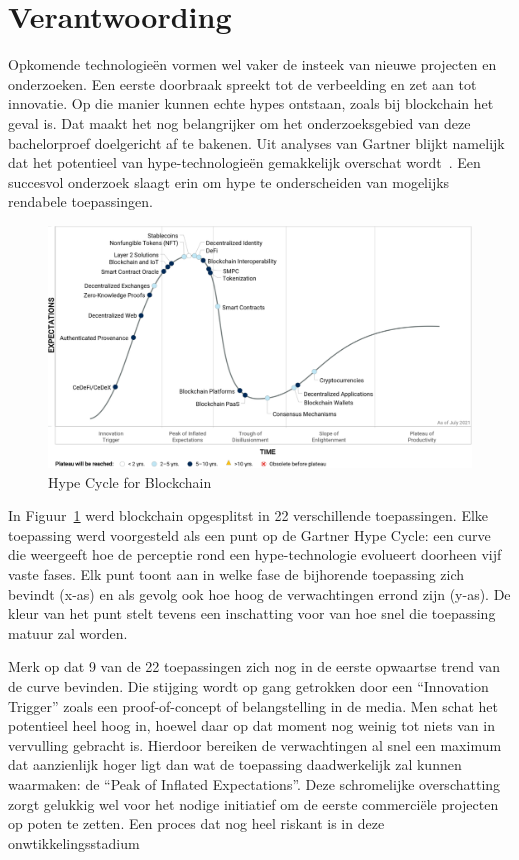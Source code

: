 \section{Verantwoording}
\label{sec:verantwoording}

Opkomende technologieën vormen wel vaker de insteek van nieuwe projecten en onderzoeken. Een eerste doorbraak spreekt tot de verbeelding en zet aan tot innovatie. Op die manier kunnen echte hypes ontstaan, zoals bij blockchain het geval is. Dat maakt het nog belangrijker om het onderzoeksgebied van deze bachelorproef doelgericht af te bakenen. Uit analyses van Gartner blijkt namelijk dat het potentieel van hype-technologieën gemakkelijk overschat wordt~\autocite{Kietzmann2018}. Een succesvol onderzoek slaagt erin om hype te onderscheiden van mogelijks rendabele toepassingen.

\begin{figure}[H]
	\includegraphics[width=\textwidth]{img/inleiding/gartner-hypecycle.png}
	\caption{\label{fig:gartner}Hype Cycle for Blockchain~\autocite{Gartner2021}}
\end{figure}

In Figuur~\ref{fig:gartner} werd blockchain opgesplitst in 22 verschillende toepassingen. Elke toepassing werd voorgesteld als een punt op de Gartner Hype Cycle: een curve die weergeeft hoe de perceptie rond een hype-technologie evolueert doorheen vijf vaste fases. Elk punt toont aan in welke fase de bijhorende toepassing zich bevindt (x-as) en als gevolg ook hoe hoog de verwachtingen errond zijn (y-as). De kleur van het punt stelt tevens een inschatting voor van hoe snel die toepassing matuur zal worden. 

Merk op dat 9 van de 22 toepassingen zich nog in de eerste opwaartse trend van de curve bevinden.
Die stijging wordt op gang getrokken door  een ``Innovation Trigger'' zoals een proof-of-concept of belangstelling in de media. Men schat het potentieel heel hoog in, hoewel daar op dat moment nog weinig tot niets van in vervulling gebracht is. Hierdoor bereiken de verwachtingen al snel een maximum dat aanzienlijk hoger ligt dan wat de toepassing daadwerkelijk zal kunnen waarmaken: de ``Peak of Inflated Expectations''. Deze schromelijke overschatting zorgt gelukkig wel voor het nodige initiatief om de eerste commerciële projecten op poten te zetten. Een proces dat nog heel riskant is in deze onwtikkelingsstadium

